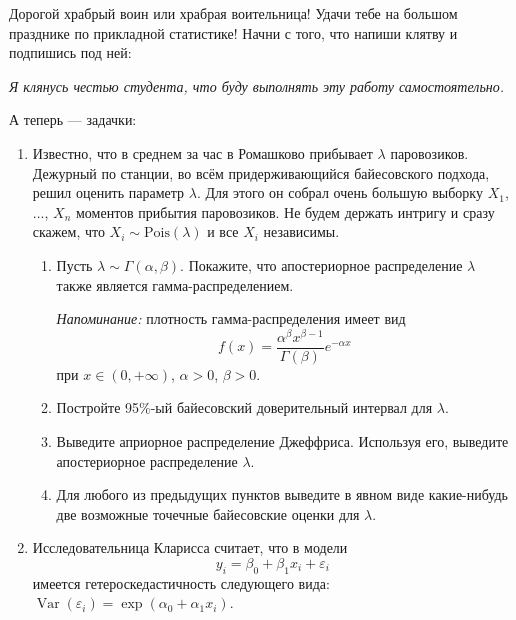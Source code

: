 \documentclass[12pt]{article}
\DeclareMathOperator{\Var}{Var}
\begin{document}
Дорогой храбрый воин или храбрая воительница! Удачи тебе на большом празднике по прикладной статистике!
Начни с того, что напиши клятву и подпишись под ней:

\vspace{10pt}
\textit{Я клянусь честью студента, что буду выполнять эту работу самостоятельно.}
\vspace{10pt}


А теперь — задачки:



	\begin{enumerate}
		\item  Известно, что в среднем за час в Ромашково прибывает $\lambda$ паровозиков. Дежурный по станции, во всём придерживающийся байесовского подхода, решил оценить параметр $\lambda$. Для этого он собрал очень большую выборку $X_1$, $\ldots$, $X_n$ моментов прибытия паровозиков. Не будем держать интригу и сразу скажем, что $X_i \sim \mathrm{Pois}(\lambda)$ и все $X_i$ независимы.
	\begin{enumerate}[label=\alph*)]
		\item Пусть $\lambda \sim \Gamma(\alpha, \beta)$. Покажите, что апостериорное распределение $\lambda$ также является гамма-распределением.
		
		\textit{Напоминание:} плотность гамма-распределения имеет вид
		\[
		f(x) = \dfrac{\alpha^{\beta}x^{\beta - 1}}{\Gamma(\beta)}e^{-\alpha x}
		\]
		при $x \in (0, +\infty)$, $\alpha > 0$, $\beta > 0$.
		
		\item Постройте 95\%-ый байесовский доверительный интервал для $\lambda$.
		
		\item Выведите априорное распределение Джеффриса. Используя его, выведите апостериорное распределение $\lambda$.
		
		\item Для любого из предыдущих пунктов выведите в явном виде какие-нибудь две возможные точечные байесовские оценки для $\lambda$.
		
	\end{enumerate}


\item Исследовательница Кларисса считает, что в модели 
\[
y_i = \beta_0 + \beta_1 x_i + \varepsilon_i
\]
имеется гетероскедастичность следующего вида: $\Var(\varepsilon_i) = \exp(\alpha_0 + \alpha_1 x_i)$.


\end{enumerate}
\end{document}
